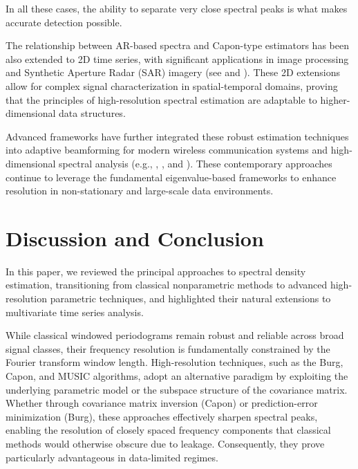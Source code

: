 \documentclass[twoside]{article}
\begin{document}
In all these cases, the ability to separate very close spectral peaks is what makes accurate detection possible.



The relationship between AR-based spectra and Capon-type estimators has been also extended to 2D time series, with significant applications in image processing and Synthetic Aperture Radar (SAR) imagery (see \cite{Larsonetal:2003} and \cite{StoicaMoses:2005}). These 2D extensions allow for complex signal characterization in spatial-temporal domains, proving that the principles of high-resolution spectral estimation are adaptable to higher-dimensional data structures.



Advanced frameworks have further integrated these robust estimation techniques into adaptive beamforming for modern wireless communication systems and high-dimensional spectral analysis (e.g., \cite{LiStoica:2005}, \cite{StoicaMoses:2005}, \cite{Iranietal:2026} and \cite{Haoetal:2026}). These contemporary approaches continue to leverage the fundamental eigenvalue-based frameworks to enhance resolution in non-stationary and large-scale data environments.



\section*{Discussion and Conclusion}



In this paper, we reviewed the principal approaches to spectral density estimation, transitioning from classical nonparametric methods to advanced high-resolution parametric techniques, and highlighted their natural extensions to multivariate time series analysis.



While classical windowed periodograms remain robust and reliable across broad signal classes, their frequency resolution is fundamentally constrained by the Fourier transform window length. High-resolution techniques, such as the Burg, Capon, and MUSIC algorithms, adopt an alternative paradigm by exploiting the underlying parametric model or the subspace structure of the covariance matrix. Whether through covariance matrix inversion (Capon) or prediction-error minimization (Burg), these approaches effectively sharpen spectral peaks, enabling the resolution of closely spaced frequency components that classical methods would otherwise obscure due to leakage. Consequently, they prove particularly advantageous in data-limited regimes.
\end{document}
